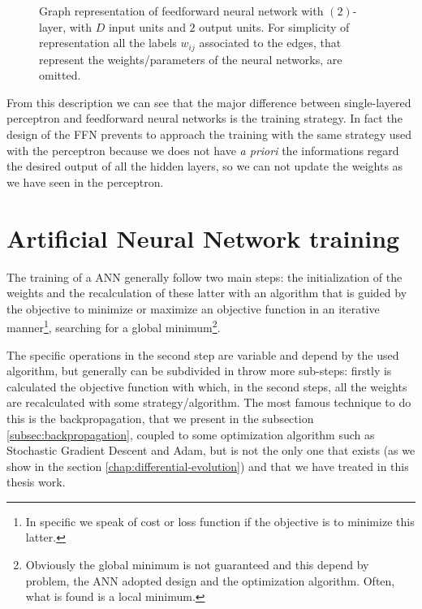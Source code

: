 \begin{figure}[t]
	\caption[Graph representation of feedforward neural network.]{Graph representation of feedforward neural network with $(2)$-layer, with $D$ input units and $2$ output units. For simplicity of representation all the labels $w_{ij}$ associated to the edges, that represent the weights/parameters of the neural networks, are omitted.}
	\label{fig:multilayer-perceptron}
\end{figure}

From this description we can see that the major difference between single-layered perceptron and feedforward neural networks is the training strategy. In fact the design of the FFN prevents to approach the training with the same strategy used with the perceptron because we does not have \textit{a priori} the informations regard the desired output of all the hidden layers, so we can not update the weights as we have seen in the perceptron.

\section{Artificial Neural Network training} 
The training of a ANN generally follow two main steps: the initialization of the weights and the recalculation of these latter with an algorithm that is guided by the objective to minimize or maximize an objective function in an iterative manner\footnote{In specific we speak of cost or loss function if the objective is to minimize this latter.}, searching for a global minimum\footnote{Obviously the global minimum is not guaranteed and this depend by problem, the ANN adopted design and the optimization algorithm. Often,  what is found is a local minimum.}.

The specific operations in the second step are variable and depend by the used algorithm, but generally can be subdivided in throw more sub-steps: firstly is calculated the objective function with which, in the second steps, all the weights are recalculated with some strategy/algorithm. The most famous technique to do this is the backpropagation, that we present in the subsection \ref{subsec:backpropagation}, coupled to some optimization algorithm such as Stochastic Gradient Descent and Adam, but is not the only one that exists (as we show in the section \ref{chap:differential-evolution}) and that we have treated in this thesis work.

